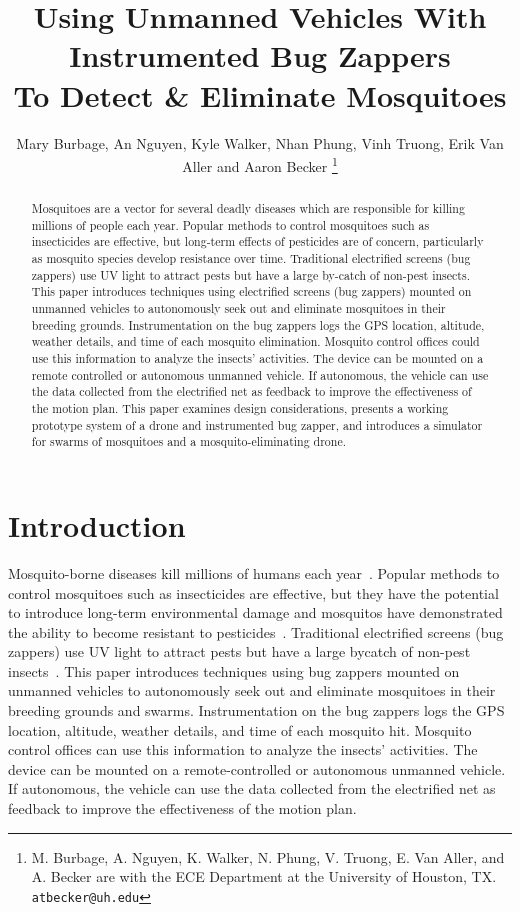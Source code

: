 \documentclass[letterpaper, 10 pt, conference]{ieeeconf}  %
\title{\LARGE \bf
Using Unmanned Vehicles With Instrumented Bug Zappers\\ To Detect \& Eliminate Mosquitoes
}
\author{Mary Burbage, An Nguyen, Kyle Walker, Nhan Phung, Vinh Truong, Erik Van Aller and Aaron Becker%
\thanks{M. Burbage, A. Nguyen, K. Walker, N. Phung, V. Truong, E. Van Aller, and A. Becker are with the ECE Department at the University of Houston, TX.
        {\tt\small atbecker@uh.edu}}%
}
\begin{document}
\maketitle
\thispagestyle{empty}
\pagestyle{empty}


\begin{abstract}
Mosquitoes are a vector for several deadly diseases which are responsible for killing millions of people each year.  Popular methods to control mosquitoes such as insecticides are effective, but long-term effects of pesticides are of concern, particularly as mosquito species develop resistance over time.
Traditional electrified screens (bug zappers) use UV light to attract pests but have a large by-catch of non-pest insects. This paper introduces techniques using electrified screens (bug zappers) mounted on unmanned vehicles to autonomously seek out and eliminate mosquitoes in their breeding grounds. Instrumentation on the bug zappers logs the GPS location, altitude, weather details, and time of each mosquito elimination. Mosquito control offices could use this information to analyze the insects' activities. The device can be mounted on a remote controlled or autonomous unmanned vehicle. If autonomous, the vehicle can use the data collected from the electrified net as feedback to improve the effectiveness of the motion plan. 
This paper examines design considerations, presents a working prototype system of a drone and instrumented bug zapper, and introduces a simulator for swarms of mosquitoes and a mosquito-eliminating drone.  
\end{abstract}


\section{Introduction}

Mosquito-borne diseases kill millions of humans each year~\cite{murray2012global}. Popular methods to control mosquitoes such as insecticides are effective, but they have the potential to introduce long-term environmental damage and mosquitos have demonstrated the ability to become resistant to pesticides~\cite{ndiath2012resistance}. Traditional electrified screens (bug zappers) use UV light to attract pests but have a large bycatch of non-pest insects~\cite{University-Of-Florida1997}. This paper introduces techniques using bug zappers mounted on unmanned vehicles to autonomously seek out and eliminate mosquitoes in their breeding grounds and swarms. Instrumentation on the bug zappers logs the GPS location, altitude, weather details, and time of each mosquito hit.  Mosquito control offices can use this information to analyze the insects' activities. The device can be mounted on a remote-controlled or autonomous unmanned vehicle. If autonomous, the vehicle can use the data collected from the electrified net as feedback to improve the effectiveness of the motion plan. 
\end{document}
